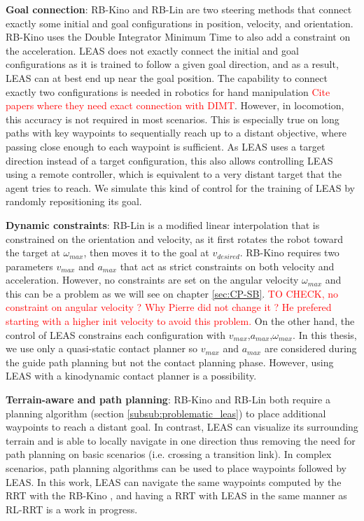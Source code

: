 \noindent \textbf{Goal connection}:
RB-Kino \cite{kinodynamic-sm} and RB-Lin \cite{AcyclicCP} are two steering methods that connect exactly some initial and goal configurations in position, velocity, and orientation. 
RB-Kino uses the Double Integrator Minimum Time \cite{DIMT_kino_planning_manipulator} to also add a constraint on the acceleration.
LEAS does not exactly connect the initial and goal configurations as it is trained to follow a given goal direction, and as a result, LEAS can at best end up near the goal position.
The capability to connect exactly two configurations is needed in robotics for hand manipulation \textcolor{red}{Cite papers where they need exact connection with DIMT}. However, in locomotion, this accuracy is not required in most scenarios.
This is especially true on long paths with key waypoints to sequentially reach up to a distant objective, where passing close enough to each waypoint is sufficient.
As LEAS uses a target direction instead of a target configuration, this also allows controlling LEAS using a remote controller, which is equivalent to a very distant target that the agent tries to reach. We simulate this kind of control for the training of LEAS by randomly repositioning its goal.

\noindent \textbf{Dynamic constraints}:
RB-Lin is a modified linear interpolation that is constrained on the orientation and velocity, as it first rotates the robot toward the target at $\omega_{max}$, then moves it to the goal at $v_{desired}$.
RB-Kino requires two parameters $v_{max}$ and $a_{max}$ that act as strict constraints on both velocity and acceleration. However, no constraints are set on the angular velocity $\omega_{max}$ and this can be a problem as we will see on chapter \ref{sec:CP-SB}. \textcolor{red}{TO CHECK, no constraint on angular velocity ? Why Pierre did not change it ? He prefered starting with a higher init velocity to avoid this problem.}
On the other hand, the control of LEAS constrains each configuration with $v_{max}$,$a_{max}$,$\omega_{max}$. 
In this thesis, we use only a quasi-static contact planner so $v_{max}$ and $a_{max}$ are considered during the guide path planning but not the contact planning phase. However, using LEAS with a kinodynamic contact planner is a possibility.

\noindent \textbf{Terrain-aware and path planning}:
RB-Kino and RB-Lin both require a planning algorithm (section \ref{subsub:problematic_leas}) to place additional waypoints to reach a distant goal. In contrast, LEAS can visualize its surrounding terrain and is able to locally navigate in one direction thus removing the need for path planning on basic scenarios (i.e. crossing a transition link). 
In complex scenarios, path planning algorithms can be used to place waypoints followed by LEAS. 
In this work, LEAS can navigate the same waypoints computed by the RRT with the RB-Kino \cite{kinodynamic-sm}, and having a RRT with LEAS in the same manner as RL-RRT \cite{RL_RRT} is a work in progress.

